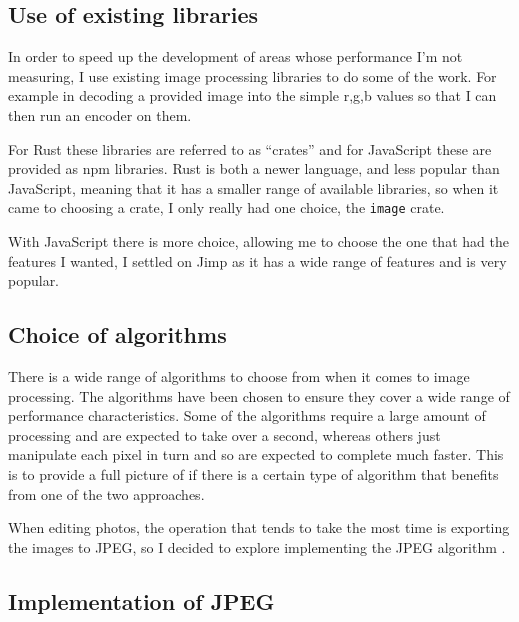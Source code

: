\documentclass[12pt,a4paper]{article}
\begin{document}
\subsection{Use of existing libraries}

In order to speed up the development of areas whose performance I'm not measuring, I use existing image processing libraries to do some of the work. For example in decoding a provided image into the simple r,g,b values so that I can then run an encoder on them.

For Rust these libraries are referred to as “crates” and for JavaScript these are provided as npm libraries. Rust is both a newer language, and less popular than JavaScript, meaning that it has a smaller range of available libraries, so when it came to choosing a crate, I only really had one choice, the \texttt{image} crate.

With JavaScript there is more choice, allowing me to choose the one that had the features I wanted, I settled on Jimp as it has a wide range of features and is very popular.



\subsection{Choice of algorithms}

There is a wide range of algorithms to choose from when it comes to image processing. The algorithms have been chosen to ensure they cover a wide range of performance characteristics. Some of the algorithms require a large amount of processing and are expected to take over a second, whereas others just manipulate each pixel in turn and so are expected to complete much faster. This is to provide a full picture of if there is a certain type of algorithm that benefits from one of the two approaches.

When editing photos, the operation that tends to take the most time is exporting the images to JPEG, so I decided to explore implementing the JPEG algorithm \cite{jpeg}.

\subsection{Implementation of JPEG}
\end{document}
